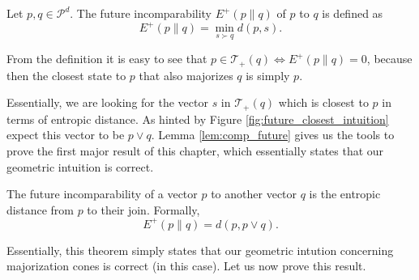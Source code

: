 \begin{definition} \label{def:future_incomparability_monotone}
    Let $p, q \in \mathcal{P}^d$. The future incomparability $E^+(p \parallel q)$ of $p$ to $q$ is defined as
    \begin{equation}
        E^+ (p \parallel q) = \min_{s \succ q} d(p, s).
    \end{equation}
\end{definition}

\begin{remark}
    From the definition it is easy to see that $p \in \mathcal{T}_+(q) \iff E^+(p \parallel q) = 0$, because then the closest state to $p$ that also majorizes $q$ is simply $p$.
\end{remark}

Essentially, we are looking for the vector $s$ in $\mathcal{T}_+(q)$ which is closest to $p$ in terms of entropic distance. As hinted by Figure \ref{fig:future_closest_intuition} expect this vector to be $p \vee q$. Lemma \ref{lem:comp_future} gives us the tools to prove the first major result of this chapter, which essentially states that our geometric intuition is correct.

\begin{theorem} \label{th:closest_future}
    The future incomparability of a vector $p$ to another vector $q$ is the entropic distance from $p$ to their join. Formally,
    \begin{equation}
        E^+ (p \parallel q) = d(p, p \vee q).
    \end{equation}
\end{theorem}

Essentially, this theorem simply states that our geometric intution concerning majorization cones is correct (in this case). Let us now prove this result.

